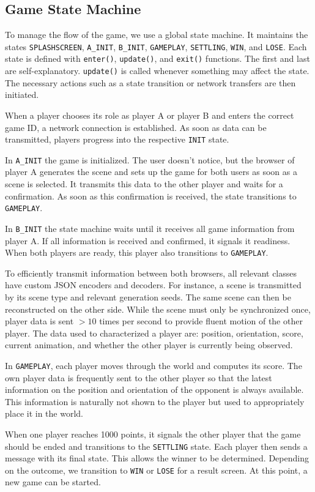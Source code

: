 \documentclass[11pt]{article}
\begin{document}
\subsection{Game State Machine}
\par To manage the flow of the game, we use a global state machine. It maintains the states \texttt{SPLASHSCREEN}, \texttt{A\_INIT}, \texttt{B\_INIT}, \texttt{GAMEPLAY}, \texttt{SETTLING}, \texttt{WIN}, and \texttt{LOSE}. Each state is defined with \texttt{enter()}, \texttt{update()}, and \texttt{exit()} functions. The first and last are self-explanatory. \texttt{update()} is called whenever something may affect the state. The necessary actions such as a state transition or network transfers are then initiated.
\par When a player chooses its role as player A or player B and enters the correct game ID, a network connection is established. As soon as data can be transmitted, players progress into the respective \texttt{INIT} state.
\par In \texttt{A\_INIT} the game is initialized. The user doesn't notice, but the browser of player A generates the scene and sets up the game for both users as soon as a scene is selected. It transmits this data to the other player and waits for a confirmation. As soon as this confirmation is received, the state transitions to \texttt{GAMEPLAY}.
\par In \texttt{B\_INIT} the state machine waits until it receives all game information from player A. If all information is received and confirmed, it signals it readiness. When both players are ready, this player also transitions to \texttt{GAMEPLAY}.
\par To efficiently transmit information between both browsers, all relevant classes have custom JSON encoders and decoders. For instance, a scene is transmitted by its scene type and relevant generation seeds. The same scene can then be reconstructed on the other side. While the scene must only be synchronized once, player data is sent $>10$ times per second to provide fluent motion of the other player. The data used to characterized a player are: position, orientation, score, current animation, and whether the other player is currently being observed.
\par In \texttt{GAMEPLAY}, each player moves through the world and computes its score. The own player data is frequently sent to the other player so that the latest information on the position and orientation of the opponent is always available. This information is naturally not shown to the player but used to appropriately place it in the world.
\par When one player reaches 1000 points, it signals the other player that the game should be ended and transitions to the \texttt{SETTLING} state. Each player then sends a message with its final state. This allows the winner to be determined. Depending on the outcome, we transition to \texttt{WIN} or \texttt{LOSE} for a result screen. At this point, a new game can be started.
\end{document}
